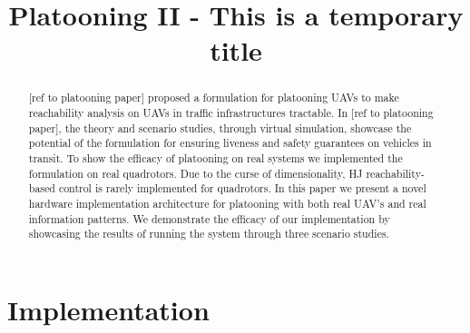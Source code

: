 \documentclass[conference]{IEEEtran}
\begin{document}
\title{Platooning II - This is a temporary title}

\maketitle

\suppressfloats

\begin{abstract}
    [ref to platooning paper] proposed a formulation for platooning
    UAVs to make reachability analysis on UAVs in traffic infrastructures
    tractable. In [ref to platooning paper], the theory and scenario studies, through
    virtual simulation, showcase the potential of the formulation for
    ensuring liveness and safety guarantees on vehicles in transit.
    To show the efficacy of platooning on real systems we
    implemented the formulation on real quadrotors. Due to the curse of
    dimensionality, HJ reachability-based control is rarely implemented for
    quadrotors. In this paper we present a novel hardware implementation
    architecture for platooning with both real UAV's and real information
    patterns. We demonstrate the efficacy of our implementation by showcasing
    the results of running the system through three scenario studies.
\end{abstract}

%
\IEEEpeerreviewmaketitle







\section{Implementation}

    

    

    



\end{document}
